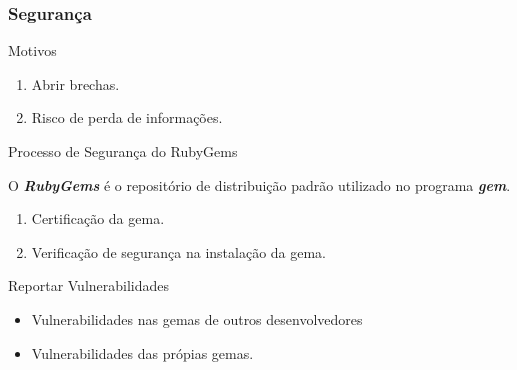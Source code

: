 \begin{frame}
 \frametitle{Segurança}

  \begin{block}{Motivos}

   \begin{enumerate}

    \item Abrir brechas.

    \item Risco de perda de informações.

   \end{enumerate}

  \end{block}

  \begin{block}{Processo de Segurança do RubyGems}

   O \emph{\textbf{RubyGems}} é o repositório de distribuição padrão utilizado no
   programa \emph{\textbf{gem}}.

   \begin{enumerate}

    \item Certificação da gema.

    \item Verificação de segurança na instalação da gema.

   \end{enumerate}

  \end{block}

  \begin{block}{Reportar Vulnerabilidades}

   \begin{itemize}

    \item Vulnerabilidades nas gemas de outros desenvolvedores

    \item Vulnerabilidades das própias gemas.

   \end{itemize}

  \end{block}

\end{frame}


